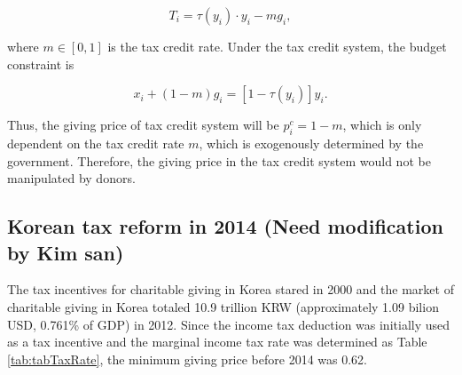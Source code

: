 \documentclass[ review  , 3p ]{elsarticle}
\begin{document}
  \[
      T_i = \tau(y_i)\cdot y_i - m g_i,
  \]
  
  where \(m \in [0, 1]\) is the tax credit rate. Under the tax credit system, the budget constraint is
  
  \[
      x_i + (1 - m) g_i = [1 - \tau(y_i)] y_i.
  \]
  
  Thus, the giving price of tax credit system will be \(p_i^c = 1 - m\), which is only dependent on the tax credit rate \(m\), which is exogenously determined by the government.
  Therefore, the giving price in the tax credit system would not be manipulated by donors.
  
  \hypertarget{korean-tax-reform-in-2014-need-modification-by-kim-san}{%
  \subsection{Korean tax reform in 2014 (Need modification by Kim san)}\label{korean-tax-reform-in-2014-need-modification-by-kim-san}}
  
  The tax incentives for charitable giving in Korea stared in 2000 and the market of charitable giving in Korea totaled 10.9 trillion KRW (approximately 1.09 bilion USD, 0.761\% of GDP) in 2012.
  Since the income tax deduction was initially used as a tax incentive and the marginal income tax rate was determined as Table \ref{tab:tabTaxRate}, the minimum giving price before 2014 was 0.62.
  
\end{document}
